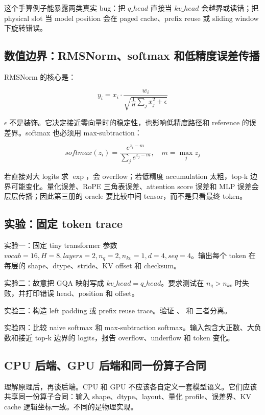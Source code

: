 这个手算例子能暴露两类真实 bug：把 \(q\_head\) 直接当 \(kv\_head\) 会越界或读错；把 physical slot 当 model position 会在 paged cache、prefix reuse 或 sliding window 下旋转错误。

\subsection{数值边界：RMSNorm、softmax 和低精度误差传播}

RMSNorm 的核心是：

\[
y_i = x_i \cdot \frac{w_i}{\sqrt{\frac{1}{H}\sum_j x_j^2 + \epsilon}}
\]

\(\epsilon\) 不是装饰。它决定接近零向量时的稳定性，也影响低精度路径和 reference 的误差界。softmax 也必须用 max-subtraction：

\[
softmax(z_i)=\frac{e^{z_i-m}}{\sum_j e^{z_j-m}},\quad m=\max_j z_j
\]

若直接对大 logits 求 \(\exp\)，会 overflow；若低精度 accumulation 太粗，top-k 边界可能变化。量化误差、RoPE 三角表误差、attention score 误差和 MLP 误差会层层传播；因此第三册的 oracle 要比较中间 tensor，而不是只看最终 token。

\subsection{实验：固定 token trace}

\begin{exercisebox}
实验一：固定 tiny transformer 参数 \(vocab=16,H=8,layers=2,n_q=2,n_{kv}=1,d=4,seq=4\)。输出每个 token 在每层的 shape、dtype、stride、KV offset 和 checksum。

实验二：故意把 GQA 映射写成 \(kv\_head=q\_head\)。要求测试在 \(n_q>n_{kv}\) 时失败，并打印错误 head、position 和 offset。

实验三：构造 left padding 或 prefix reuse trace。验证 、 和  三者分离。

实验四：比较 naive softmax 和 max-subtraction softmax。输入包含大正数、大负数和接近 top-k 边界的 logits，报告 overflow、underflow 和 token 变化。
\end{exercisebox}

\subsection{CPU 后端、GPU 后端和同一份算子合同}

理解原理后，再谈后端。CPU 和 GPU 不应该各自定义一套模型语义。它们应该共享同一份算子合同：输入 shape、dtype、layout、量化 profile、误差界、KV cache 逻辑坐标一致。不同的是物理实现。


